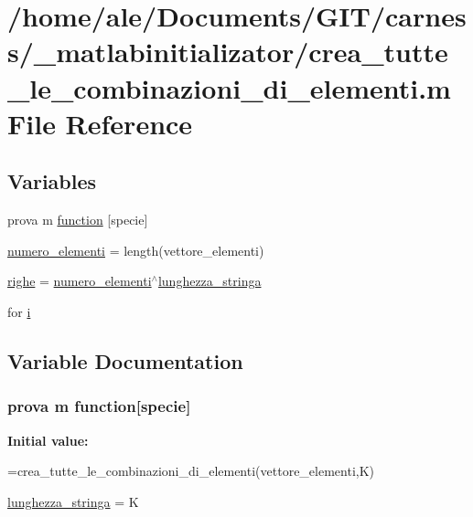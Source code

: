 \hypertarget{a00060}{\section{/home/ale/\-Documents/\-G\-I\-T/carness/\-\_\-matlabinitializator/crea\-\_\-tutte\-\_\-le\-\_\-combinazioni\-\_\-di\-\_\-elementi.m File Reference}
\label{a00060}
}
\subsection*{Variables}
\begin{DoxyCompactItemize}
\item 
prova m \hyperlink{a00060_aa23fc0b22eb0c24718a8969136a459f9}{function} \mbox{[}specie\mbox{]}
\item 
\hyperlink{a00060_a071e4a20ed3694e1603406261e60409a}{numero\-\_\-elementi} = length(vettore\-\_\-elementi)
\item 
\hyperlink{a00060_abdf49e297e2c121f2d09f075ac3d518a}{righe} = \hyperlink{a00060_a071e4a20ed3694e1603406261e60409a}{numero\-\_\-elementi}$^\wedge$\hyperlink{a00062_ac8e6822c23445dded564fea9780d869d}{lunghezza\-\_\-stringa}
\item 
for \hyperlink{a00060_a6f6ccfcf58b31cb6412107d9d5281426}{i}
\end{DoxyCompactItemize}


\subsection{Variable Documentation}
\hypertarget{a00060_aa23fc0b22eb0c24718a8969136a459f9}{
\subsubsection[{function}]{\setlength{\rightskip}{0pt plus 5cm}prova m function\mbox{[}specie\mbox{]}}}\label{a00060_aa23fc0b22eb0c24718a8969136a459f9}
{\bfseries Initial value\-:}
\begin{DoxyCode}
=crea\_tutte\_le\_combinazioni\_di\_elementi(vettore\_elementi,K)


\hyperlink{a00062_ac8e6822c23445dded564fea9780d869d}{lunghezza\_stringa} = K
\end{DoxyCode}



